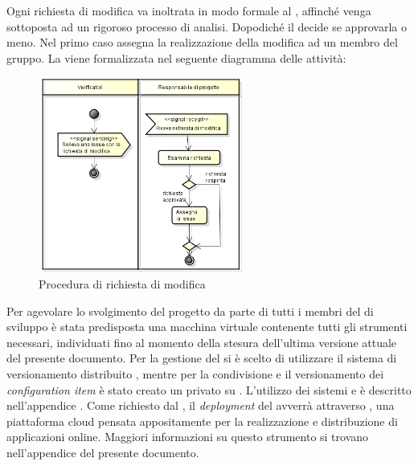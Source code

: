 			\label{sec:StrutturaIssue}
				Ogni richiesta di modifica va inoltrata in modo formale al , affinché venga sottoposta ad un rigoroso processo di analisi. Dopodiché il  decide se approvarla o meno. Nel primo caso assegna la realizzazione della modifica ad un membro del gruppo. 
				La  viene formalizzata nel seguente diagramma delle attività:
				\begin{figure}[H]
					\centering
					\includegraphics[width=0.6\textwidth]{NormeDiProgetto/Pics/RichiestaDiModifica}
					\caption{Procedura di richiesta di modifica}
				\end{figure}
						
			Per agevolare lo svolgimento del progetto da parte di tutti i membri del  di sviluppo è stata predisposta una macchina virtuale contenente tutti gli strumenti  necessari, individuati fino al momento della stesura dell'ultima versione attuale del presente documento.
				Per la gestione del  si è scelto di utilizzare il sistema di versionamento distribuito , mentre per la condivisione e il versionamento dei \textit{configuration item} è stato creato un  privato su .
				L'utilizzo dei sistemi  e  è descritto nell'appendice .
				Come richiesto dal , il \textit{deployment} del  avverrà attraverso , una piattaforma cloud pensata appositamente per la realizzazione e distribuzione di applicazioni online. Maggiori informazioni su questo strumento si trovano nell'appendice  del presente documento.
			
